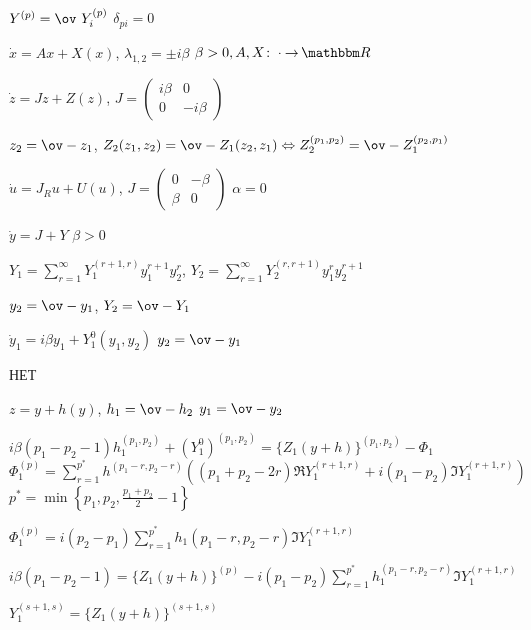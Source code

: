 \documentclass[timbord]{longnotes}
\begin{document}
\begin{list}
  \item $Y^{(p)} = \ov~{Y}_i^{(p)}$ \hfill $\delta_{pi}= 0$
  \item $\dot x = Ax + X(x)$, $\lambda_{1,2} = \pm i \beta$ \hfill $\beta >0, A,X\colon\cdot\to\R$
  \item $\dot z= Jz + Z(z)$, $J = \left(\begin{matrix}
      i \beta & 0 \\ 0& -i \beta
  \end{matrix}\right)
  $
  \item $z_2 = \ov- z_1$, 
    $Z_2(z_1, z_2) = \ov-{Z}_1 (z_2, z_1) \Leftrightarrow Z_2^{(p_1,p_2)} = \ov-Z_1^{(p_2, p_1)}$
  \item $\dot u = J_R u + U(u)$,
    $J = \left(
      \begin{matrix}
        0 & -\beta \\ \beta & 0 
      \end{matrix}
    \right)$ \hfill $\alpha = 0$
  \item $\dot y = J+Y$ \hfill $\beta >0$
  \item $Y_1 = \sum_{r=1}^\infty Y_1^{(r+1,r)} y_1^{r+1} y_2 ^{r}$, \quad 
    $Y_2 = \sum_{r=1}^\infty Y_2^{(r,r+1)} y_1^{r} y_2 ^{r+1}$
  \item $y_2 = \ov-y_1$, $Y_2 = \ov-Y_1$
  \item $\dot y_1 = i \beta y_1 + Y_1^0 (y_1,y_2)$ \hfill $y_2 = \ov-y_1$
  \item НЕТ
  \item $z=y + h(y)$, $h_1 = \ov-h_2$ \hfill $y_1 = \ov- y_2$
  \item $i \beta (p_1 - p_2 -1)h_1^{(p_1,p_2)} + {\left(Y_1^0\right)}^{(p_1,p_2)} =
    \{Z_1(y+h)\}^{(p_1,p_2)} - \Phi_1$ \\
    $\Phi_1^{(p)} 
    = \sum_{r=1}^{p^*} h^{(p_1-r,p_2-r)}\left(( p_1+p_2 -2r) \Re Y_1^{(r+1,r)} + i (p_1-p_2) \Im
    Y_1^{(r+1,r)}\right)$ \\
    $p^* = \min\left\{p_1,p_2, \frac{p_1+p_2}2-1\right\}$
  \item $\Phi_1^{(p)} = i(p_2-p_1)\sum_{r=1}^{p^*} h_1(p_1-r,p_2-r) \Im Y_1^{(r+1,r)}$
  \item $i \beta (p_1 - p_2 -1) 
    = \{Z_1(y+h)\}^{(p)} - i (p_1-p_2) \sum_{r=1}^{p^*}h_1^{(p_1-r,p_2-r)} \Im Y_1^{(r+1,r)}$
  \item $Y_1^{(s+1,s)} = \{Z_1(y+h)\}^{(s+1,s)}$
\end{list}
\end{document}
